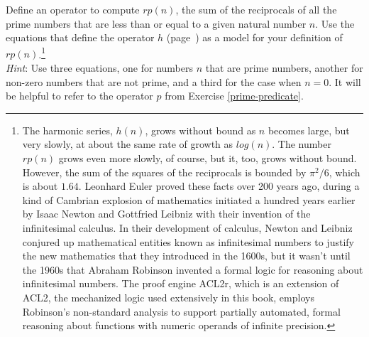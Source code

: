 \begin{ExerciseList}
\Exercise Define an operator to compute $rp(n)$,
the sum of the reciprocals of all the prime numbers that are less than or equal to
a given natural number $n$.
Use the equations that define the operator
$h$ (page~\pageref{reciprocalsdef})
as a model for your definition of $rp(n)$.\footnote{The
harmonic series, $h(n)$,
grows without bound as $n$ becomes large,
but very slowly, at about the same rate of growth as $log(n)$.
The number $rp(n)$ grows even more slowly, of course,
but it, too, grows without bound.
However, the sum of the squares of the reciprocals is bounded
by $\pi^2/6$, which is about $1.64$.
Leonhard Euler proved these facts over 200 years ago, during
a kind of Cambrian explosion of mathematics initiated a hundred years earlier
by Isaac Newton and Gottfried Leibniz
with their invention of the infinitesimal calculus.
In their development of calculus,
Newton and Leibniz conjured up mathematical entities known as infinitesimal numbers
to justify the new mathematics that they introduced in the 1600s,
but it wasn't until the 1960s that Abraham Robinson invented a formal logic
for reasoning about infinitesimal numbers.
The proof engine ACL2r, which is an extension of ACL2,
the mechanized logic used extensively in this book,
employs Robinson's non-standard analysis
to support partially automated, formal reasoning about functions with
numeric operands of infinite precision.}\\
\emph{Hint}: Use three equations, one for numbers $n$ that are prime numbers,
another for non-zero numbers that are not prime,
and a third for the case when $n = 0$.
It will be helpful to refer to the operator $p$ from Exercise \ref{prime-predicate}.
\end{ExerciseList}


